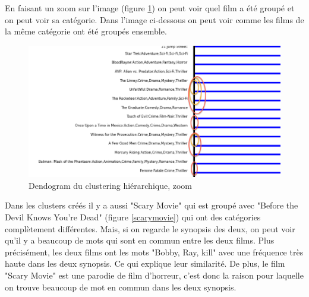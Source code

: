 En faisant un zoom sur l'image (figure \ref{zoom}) on peut voir quel film a été groupé et on peut voir sa catégorie. Dans l'image ci-dessous on peut voir comme les films de la même catégorie ont été groupés ensemble.

\begin{figure}[h]
  \centering
    \includegraphics[width=1\linewidth]{img/zoom.png}
  \caption{Dendogram du clustering hiérarchique, zoom}
  \label{zoom}
\end{figure}
\newpage
Dans les clusters créés il y a aussi "Scary Movie" qui est groupé avec "Before the Devil Knows You're Dead" (figure \ref{scarymovie}) qui ont des catégories complètement différentes. Mais, si on regarde le synopsis des deux, on peut voir qu’il y a beaucoup de mots qui sont en commun entre les deux films. Plus précisément, les deux films ont les mots "Bobby, Ray, kill" avec une fréquence très haute dans les deux synopsis. Ce qui explique leur similarité. De plus, le film "Scary Movie" est une parodie de film d'horreur, c'est donc la raison pour laquelle on trouve beaucoup de mot en commun dans les deux synopsis.
 
